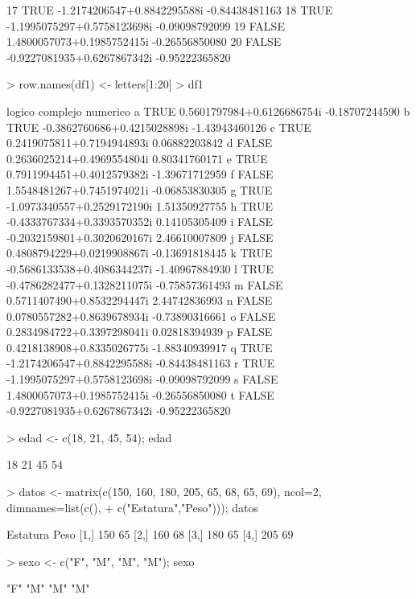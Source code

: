\documentclass{article}
\begin{document}
\begin{Schunk}
\begin{Soutput}
17   TRUE -1.2174206547+0.8842295588i -0.84438481163
18   TRUE -1.1995075297+0.5758123698i -0.09098792099
19  FALSE  1.4800057073+0.1985752415i -0.26556850080
20  FALSE -0.9227081935+0.6267867342i -0.95222365820
\end{Soutput}
\begin{Sinput}
> row.names(df1) <- letters[1:20]
> df1
\end{Sinput}
\begin{Soutput}
  logico                    complejo       numerico
a   TRUE  0.5601797984+0.6126686754i -0.18707244590
b   TRUE -0.3862760686+0.4215028898i -1.43943460126
c   TRUE  0.2419075811+0.7194944893i  0.06882203842
d  FALSE  0.2636025214+0.4969554804i  0.80341760171
e   TRUE  0.7911994451+0.4012579382i -1.39671712959
f  FALSE  1.5548481267+0.7451974021i -0.06853830305
g   TRUE -1.0973340557+0.2529172190i  1.51350927755
h   TRUE -0.4333767334+0.3393570352i  0.14105305409
i  FALSE -0.2032159801+0.3020620167i  2.46610007809
j  FALSE  0.4808794229+0.0219908867i -0.13691818445
k   TRUE -0.5686133538+0.4086344237i -1.40967884930
l   TRUE -0.4786282477+0.1328211075i -0.75857361493
m  FALSE  0.5711407490+0.8532294447i  2.44742836993
n  FALSE  0.0780557282+0.8639678934i -0.73890316661
o  FALSE  0.2834984722+0.3397298041i  0.02818394939
p  FALSE  0.4218138908+0.8335026775i -1.88340939917
q   TRUE -1.2174206547+0.8842295588i -0.84438481163
r   TRUE -1.1995075297+0.5758123698i -0.09098792099
s  FALSE  1.4800057073+0.1985752415i -0.26556850080
t  FALSE -0.9227081935+0.6267867342i -0.95222365820
\end{Soutput}
\begin{Sinput}
> edad <- c(18, 21, 45, 54); edad
\end{Sinput}
\begin{Soutput}
[1] 18 21 45 54
\end{Soutput}
\begin{Sinput}
> datos <- matrix(c(150, 160, 180, 205, 65, 68, 65, 69), ncol=2, dimnames=list(c(),
+                                                                              c("Estatura","Peso"))); datos
\end{Sinput}
\begin{Soutput}
     Estatura Peso
[1,]      150   65
[2,]      160   68
[3,]      180   65
[4,]      205   69
\end{Soutput}
\begin{Sinput}
> sexo <- c("F", "M", "M", "M"); sexo
\end{Sinput}
\begin{Soutput}
[1] "F" "M" "M" "M"

\end{Soutput}
\end{Schunk}
\end{document}
